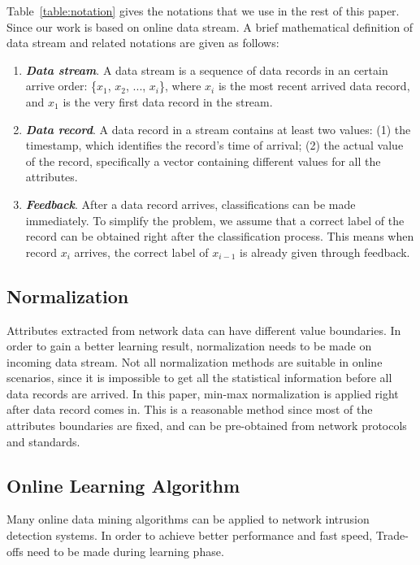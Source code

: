 \documentclass[runningheads]{llncs}
\begin{document}
	Table~\ref{table:notation} gives the notations that we use in the rest of this paper. Since our work is based on online data stream. A brief mathematical definition of data stream and related notations are given as follows:
	
	\begin{enumerate}
		\item \textbf{\textit{Data stream}}. A data stream is a sequence of data records in an certain arrive order: \big\{$x_1$, $x_2$, ..., $x_i$\big\}, where $x_i$ is the most recent arrived data record, and $x_1$ is the very first data record in the stream.
		\item \textbf{\textit{Data record}}. A data record in a stream contains at least two values: (1) the timestamp, which identifies the record's time of arrival; (2) the actual value of the record, specifically a vector containing different values for all the attributes.
		\item \textbf{\textit{Feedback}}. After a data record arrives, classifications can be made immediately. To simplify the problem, we assume that a correct label of the record can be obtained right after the classification process. This means when record $x_i$ arrives, the correct label of $x_{i-1}$ is already given through feedback.
	\end{enumerate}
	
	\subsection{Normalization}
	Attributes extracted from network data can have different value boundaries. In order to gain a better learning result, normalization needs to be made on incoming data stream. Not all normalization methods are suitable in online scenarios, since it is impossible to get all the statistical information before all data records are arrived. In this paper, min-max normalization is applied right after data record comes in. This is a reasonable method since most of the attributes boundaries are fixed, and can be pre-obtained from network protocols and standards.
	
	\subsection{Online Learning Algorithm}
	Many online data mining algorithms can be applied to network intrusion detection systems. In order to achieve better performance and fast speed, Trade-offs need to be made during learning phase.
	
\end{document}
